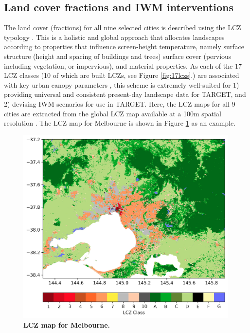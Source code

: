 \documentclass[utf8]{frontiersSCNS} %
\begin{document}
\subsection{Land cover fractions and IWM interventions}\label{sec:lc}

The land cover (fractions) for all nine selected cities is described using the LCZ typology \citep{Stewart2012b}. This is a holistic and global approach that allocates landscapes according to properties that influence screen-height temperature, namely surface structure (height and spacing of buildings and trees) surface cover (pervious including vegetation, or impervious), and material properties. As each of the 17 LCZ classes (10 of which are built LCZs, see Figure \ref{fig:17lczs}.) are associated with key urban canopy parameters \citep{Ching2018a}, this scheme is extremely well-suited for 1) providing universal and consistent present-day landscape data for TARGET, and 2) devising IWM scenarios for use in TARGET. Here, the LCZ maps for all 9 cities are extracted from the global LCZ map available at a 100m spatial resolution \citep{Demuzere2022Final}. The LCZ map for Melbourne is shown in Figure \ref{fig:MelLCZ} as an example.

\begin{figure}
\centering
\includegraphics[width=0.99\textwidth]{images/image4.jpg}
\caption{\bf LCZ map for Melbourne.}
 \label{fig:MelLCZ}
\end{figure}
\end{document}
